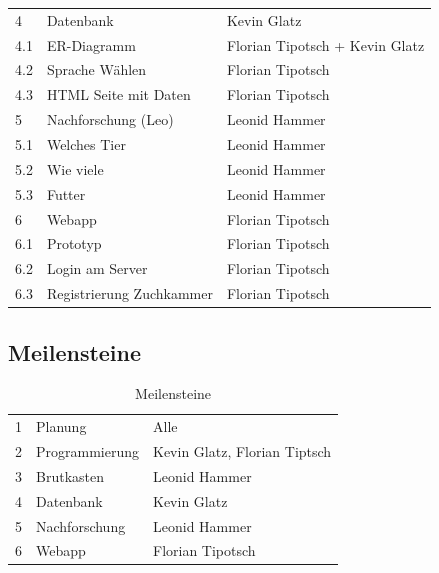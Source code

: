 \begin{table}[H]
\begin{tabular}{lll}
		4     & Datenbank                        & Kevin Glatz                    \\
		4.1   & ER-Diagramm                      & Florian Tipotsch + Kevin Glatz \\
		4.2   & Sprache Wählen                   & Florian Tipotsch               \\
		4.3   & HTML Seite mit Daten             & Florian Tipotsch               \\
		5     & Nachforschung (Leo)              & Leonid Hammer                  \\
		5.1   & Welches Tier                     & Leonid Hammer                  \\
		5.2   & Wie viele                        & Leonid Hammer                  \\
		5.3   & Futter                           & Leonid Hammer                  \\
		6     & Webapp                           & Florian Tipotsch               \\
		6.1   & Prototyp                         & Florian Tipotsch               \\
		6.2   & Login am Server                  & Florian Tipotsch               \\
		6.3   & Registrierung Zuchkammer         & Florian Tipotsch              
	\end{tabular}
\end{table}

\subsection{Meilensteine}

\begin{table}[H]
	\caption{Meilensteine}
	\label{meilensteine}
	\begin{tabular}{lll}
		1   & Planung                      & Alle                         \\
		2   & Programmierung & Kevin Glatz, Florian Tiptsch \\
		3   & Brutkasten             & Leonid Hammer                \\
		4   & Datenbank                    & Kevin Glatz                  \\
		5   & Nachforschung           & Leonid Hammer                \\
		6   & Webapp                       & Florian Tipotsch            
	\end{tabular}
\end{table}

